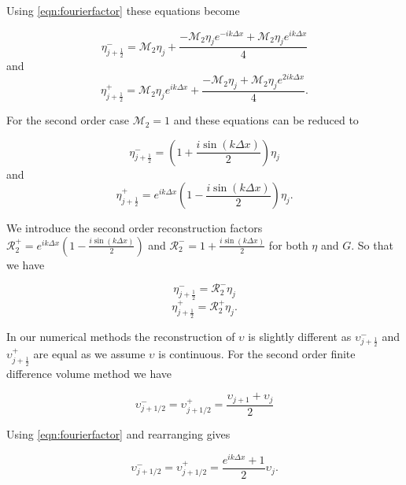 Using \eqref{eqn:fourierfactor} these equations become

\begin{equation*}
\eta^-_{j+\frac{1}{2}} = \mathcal{M}_2{\eta}_j + \frac{- \mathcal{M}_2{\eta}_{j} e^{-ik\Delta x} + \mathcal{M}_2{\eta}_{j} e^{ik\Delta x}}{4}
\end{equation*}
and
\begin{equation*}
\eta^+_{j+\frac{1}{2}} = \mathcal{M}_2{\eta}_{j}e^{ik\Delta x} + \frac{- \mathcal{M}_2{\eta}_{j} + \mathcal{M}_2{\eta}_{j}e^{2ik\Delta x} }{4}.
\end{equation*}

For the second order case $\mathcal{M}_2 = 1$ and these equations can be reduced to 

\begin{equation*}
\eta^-_{j+\frac{1}{2}} = \left(1  + \frac{i\sin\left(k\Delta x\right)}{2} \right){\eta}_j
\end{equation*}
and
\begin{equation*}
\eta^+_{j+\frac{1}{2}} = e^{ik\Delta x}\left(1  - \frac{i\sin\left(k\Delta x\right)}{2} \right){\eta}_{j}.
\end{equation*}
	
We introduce the second order reconstruction factors\\ $\mathcal{R}^+_2 = e^{ik\Delta x}\left(1  - \frac{i\sin\left(k\Delta x\right)}{2} \right)$ and $\mathcal{R}^-_2 = 1  + \frac{i\sin\left(k\Delta x\right)}{2}$ for both $\eta$ and $G$. So that we have 

\begin{equation*}
\eta^-_{j+\frac{1}{2}} = \mathcal{R}^-_2 {\eta}_j
\end{equation*}
\begin{equation*}
\eta^+_{j+\frac{1}{2}} = \mathcal{R}^+_2{\eta}_{j}.
\end{equation*}

In our numerical methods the reconstruction of $\upsilon$ is slightly different as $\upsilon ^-_{j+\frac{1}{2}}$ and $\upsilon ^+_{j+\frac{1}{2}}$ are equal as we assume $\upsilon$ is continuous. For the second order finite difference volume method we have

\begin{equation*}
\upsilon^-_{j + 1/2} = \upsilon^+_{j + 1/2} = \frac{\upsilon_{j+1} + \upsilon_{j}}{2}
\end{equation*}

Using \eqref{eqn:fourierfactor} and rearranging gives

\begin{equation*}
\label{eqn:2ndreconu}
\upsilon^-_{j + 1/2} = \upsilon^+_{j + 1/2} = \frac{e^{ik\Delta x } + 1}{2} \upsilon_{j}.
\end{equation*}

